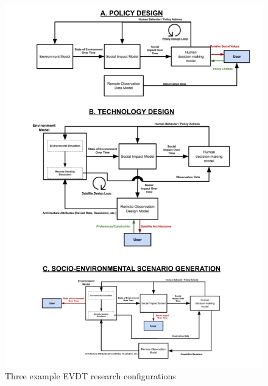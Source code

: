 \clearpage
\begin{figure}[!htb]
	\centering
	\includegraphics[scale=0.5]{Figures/chap3/Loops_Combined.png}
	\caption{Three example EVDT research configurations}
	\label{fig:combo}
\end{figure}
\clearpage









%
%


